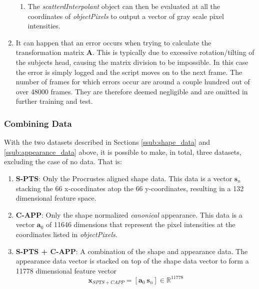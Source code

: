 \documentclass[Main]{subfiles}
\begin{document}
\begin{enumerate}
\begin{enumerate}[label=\Roman*.]
						\item
						The \emph{scatterdInterpolant} object can then be evaluated at all the coordinates of \emph{objectPixels} to output a vector of gray scale pixel intensities.
						
					\end{enumerate}

					\item
					It can happen that an error occurs when trying to calculate the transformation matrix $\textbf{A}$.
					This is typically due to excessive rotation/tilting of the subjects head, causing the matrix division to be impossible.
					In this case the error is simply logged and the script moves on to the next frame.
					The number of frames for which errors occur are around a couple hundred out of over 48000 frames.
					They are therefore deemed negligible and are omitted in further training and test.

				\end{enumerate}


		\subsubsection{Combining Data} %
			\label{ssub:combining_data}
			With the two datasets described in Sections \ref{ssub:shape_data} and \ref{ssub:appearance_data} above, it is possible to make, in total, three datasets, excluding the case of no data.
			That is:
			\begin{enumerate}
				\item
				\textbf{S-PTS}: 
				Only the Procrustes aligned shape data.
				This data is a vector $\textbf{s}_n$ stacking the 66 x-coordinates atop the 66 y-coordinates, resulting in a 132 dimensional feature space.

				\item
				\textbf{C-APP}:
				Only the shape normalized \emph{canonical} appearance.
				This data is a vector $\textbf{a}_0$ of 11646 dimensions that represent the pixel intensities at the coordinates listed in \emph{objectPixels}.

				\item
				\textbf{S-PTS + C-APP}:
				A combination of the shape and appearance data.
				The appearance data vector is stacked on top of the shape data vector to form a 11778 dimensional feature vector
				\begin{equation}
					\textbf{x}_{SPTS+CAPP} = 
						[\textbf{a}_0\ \textbf{s}_n] 
						\in \mathbb{R}^{11778}
				\end{equation}

			\end{enumerate}
\end{document}
